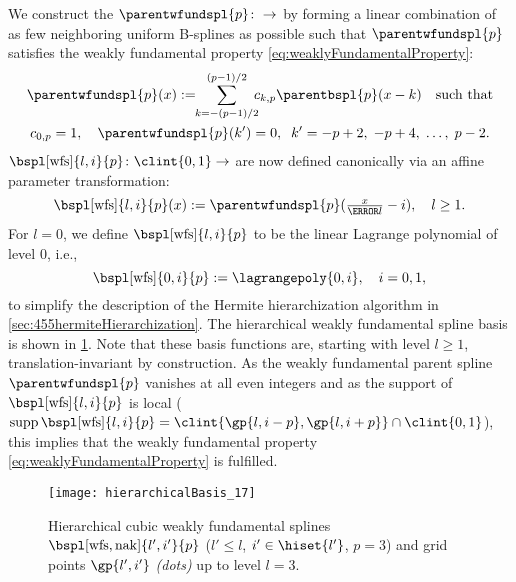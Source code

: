 We construct the 
$\parentwfundspl{p}\colon \real \to \real$
by forming a linear combination of as few neighboring
uniform B-splines as possible such that $\parentwfundspl{p}$
satisfies the weakly fundamental property
\eqref{eq:weaklyFundamentalProperty}:
\begin{gather}
  \label{eq:weaklyFundamentalSplineParent}
  \parentwfundspl{p}(x)
  := \!\!\sum_{k=-(p-1)/2}^{(p-1)/2}\!\!\!
  \wfundsplcoeff{k}{p} \parentbspl{p}(x - k)
  \quad\text{such that}\\
  \wfundsplcoeff{0}{p} = 1,\quad
  \parentwfundspl{p}(k') = 0,\;\;
  k' = -p + 2,\; -p + 4,\; \dotsc,\; p - 2.
\end{gather}
$\bspl[\wfs]{l,i}{p}\colon \clint{0, 1} \to \real$
are now defined canonically via an affine parameter transformation:
\begin{equation}
  \bspl[\wfs]{l,i}{p}(x)
  := \parentwfundspl{p}(\tfrac{x}{\ms{l}} - i),\quad
  l \ge 1.
\end{equation}
For $l = 0$, we define $\bspl[\wfs]{l,i}{p}$ to be the
linear Lagrange polynomial of level $0$, i.e.,
\begin{equation}
  \bspl[\wfs]{0,i}{p}
  := \lagrangepoly{0,i},\quad
  i = 0, 1,
\end{equation}
to simplify the description of the
Hermite hierarchization algorithm in \cref{sec:455hermiteHierarchization}.
The hierarchical weakly fundamental spline basis is shown in
\cref{fig:hierarchicalWeaklyFundamentalSpline}.
Note that these basis functions are, starting with level $l \ge 1$,
translation-invariant by construction.
As the weakly fundamental parent spline $\parentwfundspl{p}$
vanishes at all even integers and as the
support of $\bspl[\wfs]{l,i}{p}$ is local
($\supp \bspl[\wfs]{l,i}{p}
= \clint{\gp{l,i-p}, \gp{l,i+p}} \cap \clint{0, 1}$),
this implies that the weakly fundamental property
\eqref{eq:weaklyFundamentalProperty} is fulfilled.

\begin{SCfigure}
  \texttt{[image: hierarchicalBasis\_17]}%
  \caption[%
    Hierarchical weakly fundamental splines%
  ]{%
    Hierarchical cubic weakly fundamental splines
    $\bspl[\wfs,\nak]{l',i'}{p}$
    ($l' \le l$, $i' \in \hiset{l'}$, $p = 3$) and
    grid points $\gp{l',i'}$ \emph{(dots)} up to level $l = 3$.%
  }%
  \label{fig:hierarchicalWeaklyFundamentalSpline}%
\end{SCfigure}

